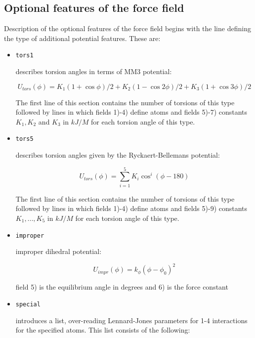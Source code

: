 \documentclass{article}
\begin{document}
\subsection{Optional features of the force field}
 
Description of the optional features of the force field begins with 
the line defining the type of additional potential features.
These are:

\begin{itemize}

\item
\verb|tors1| 

describes torsion angles in terms of MM3 potential:

\begin{equation}
\label{tors1}
U_{tors}(\phi) = K_1(1+\cos{\phi})/2 + K_2(1-\cos{2\phi})/2 + K_3(1+\cos{3\phi})/2
\end{equation}

The first line of this section contains the number of torsions of this type
followed by lines in which fields 1)-4) define atoms and fields 5)-7) 
constants $K_1,K_2$ and $K_3$ in $kJ/M$ for each torsion angle of this type.

\item
\verb|tors5| 

describes torsion angles given by the Ryckaert-Bellemans potential:

\begin{equation}
\label{tors5}
U_{tors}(\phi) = \sum_{i=1}^5 K_i\cos^i(\phi - 180)
\end{equation}

The first line of this section contains the number of torsions of this type
followed by lines in which fields 1)-4) define atoms and fields 5)-9) 
constants $K_1,...,K_5$ in $kJ/M$ for each torsion angle of this type.

\item
\verb|improper|   

improper dihedral potential:

\begin{equation}
\label{harm-ang}
U_{impr}(\phi) = k_{\phi}(\phi - \phi_0)^2
\end{equation}

field 5) is the equilibrium angle in degrees and 6) is the force constant

\item
\verb|special| 

introduces a list, over-reading Lennard-Jones parameters for 1-4 interactions 
for the specified atoms. This list consists of the following:
 

\end{itemize}
\end{document}
